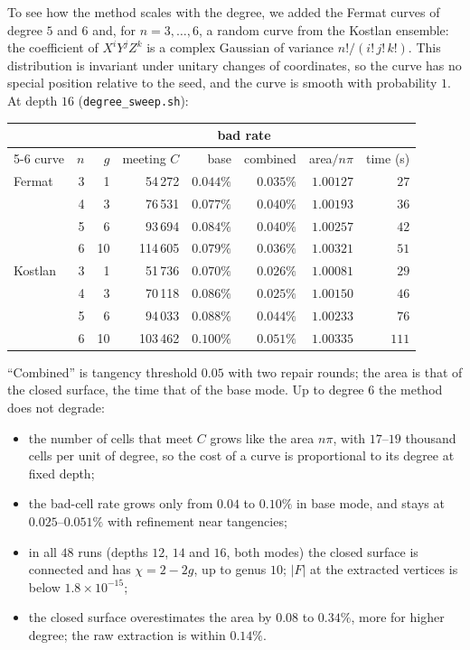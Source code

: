 \documentclass[11pt]{article}
\theoremstyle{plain}
\theoremstyle{definition}
\theoremstyle{remark}
\begin{document}
To see how the method scales with the degree, we added the Fermat
curves of degree $5$ and $6$ and, for $n=3,\dots,6$, a random curve from
the Kostlan ensemble: the coefficient of $X^iY^jZ^k$ is a complex
Gaussian of variance $n!/(i!\,j!\,k!)$. This distribution is invariant
under unitary changes of coordinates, so the curve has no special
position relative to the seed, and the curve is smooth with probability
$1$. At depth $16$ (\texttt{degree\_sweep.sh}):
\begin{center}
\small
\begin{tabular}{@{}lrrrrrrr@{}}
\toprule
& & & & \multicolumn{2}{c}{bad rate} & & \\
\cmidrule(lr){5-6}
curve & $n$ & $g$ & meeting $C$ & base & combined & area$/n\pi$ & time (s) \\
\midrule
Fermat & 3 & 1  & 54\,272  & $0.044\%$ & $0.035\%$ & $1.00127$ & $27$ \\
       & 4 & 3  & 76\,531  & $0.077\%$ & $0.040\%$ & $1.00193$ & $36$ \\
       & 5 & 6  & 93\,694  & $0.084\%$ & $0.040\%$ & $1.00257$ & $42$ \\
       & 6 & 10 & 114\,605 & $0.079\%$ & $0.036\%$ & $1.00321$ & $51$ \\
\midrule
Kostlan & 3 & 1  & 51\,736  & $0.070\%$ & $0.026\%$ & $1.00081$ & $29$ \\
        & 4 & 3  & 70\,118  & $0.086\%$ & $0.025\%$ & $1.00150$ & $46$ \\
        & 5 & 6  & 94\,033  & $0.088\%$ & $0.044\%$ & $1.00233$ & $76$ \\
        & 6 & 10 & 103\,462 & $0.100\%$ & $0.051\%$ & $1.00335$ & $111$ \\
\bottomrule
\end{tabular}
\end{center}
``Combined'' is tangency threshold $0.05$ with two repair rounds; the
area is that of the closed surface, the time that of the base mode. Up to
degree $6$ the method does not degrade:
\begin{itemize}[itemsep=1pt]
\item the number of cells that meet $C$ grows like the area $n\pi$, with
  $17$--$19$ thousand cells per unit of degree, so the cost of a curve is
  proportional to its degree at fixed depth;
\item the bad-cell rate grows only from $0.04$ to $0.10\%$ in base mode,
  and stays at $0.025$--$0.051\%$ with refinement near tangencies;
\item in all $48$ runs (depths $12$, $14$ and $16$, both modes) the closed
  surface is connected and has $\chi=2-2g$, up to genus $10$; $|F|$ at
  the extracted vertices is below $1.8\times10^{-15}$;
\item the closed surface overestimates the area by $0.08$ to $0.34\%$,
  more for higher degree; the raw extraction is within $0.14\%$.
\end{itemize}
\end{document}
